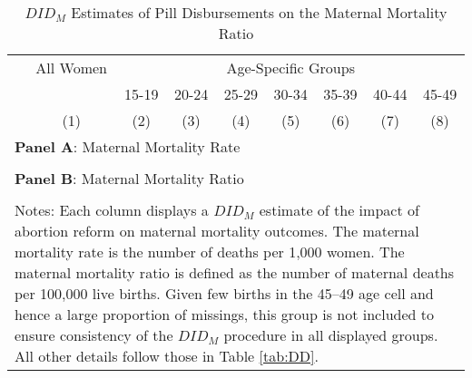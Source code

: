 \documentclass[12pt]{article}
\begin{document}
\begin{landscape}
  \begin{table}
    \centering
    \caption{$DID_M$ Estimates of Pill Disbursements on the Maternal Mortality Ratio}
    \label{tab:DDMMR}
    \begin{tabular}{lcccccccc}\toprule
      &All Women&\multicolumn{7}{c}{Age-Specific Groups} \\ \cmidrule(r){3-9}
      &&15-19&20-24&25-29&30-34&35-39&40-44&45-49 \\
      &(1)&(2)&(3)&(4)&(5)&(6)&(7)&(8) \\ \midrule
      \multicolumn{9}{l}{\textbf{Panel A}: Maternal Mortality Rate} \\
       \\
      \multicolumn{9}{l}{\textbf{Panel B}: Maternal Mortality Ratio} \\
       \\
      \bottomrule
      \multicolumn{9}{p{19.8cm}}{{\footnotesize Notes: Each column displays a $DID_M$ estimate of the impact of abortion reform on maternal mortality outcomes.  The maternal mortality rate is the number of deaths per 1,000 women.  The maternal mortality ratio is defined as the number of maternal deaths per 100,000 live births.  Given few births in the 45--49 age cell and hence a large proportion of missings, this group is not included to ensure consistency of the $DID_M$ procedure in all displayed groups. All other details follow those in Table \ref{tab:DD}.}}
    \end{tabular}
  \end{table}
\end{landscape}





\clearpage
\renewcommand{\thetable}{B\arabic{table}}
\setcounter{table}{0}
\renewcommand{\thefigure}{B\arabic{figure}}
\setcounter{figure}{0}
\end{document}
